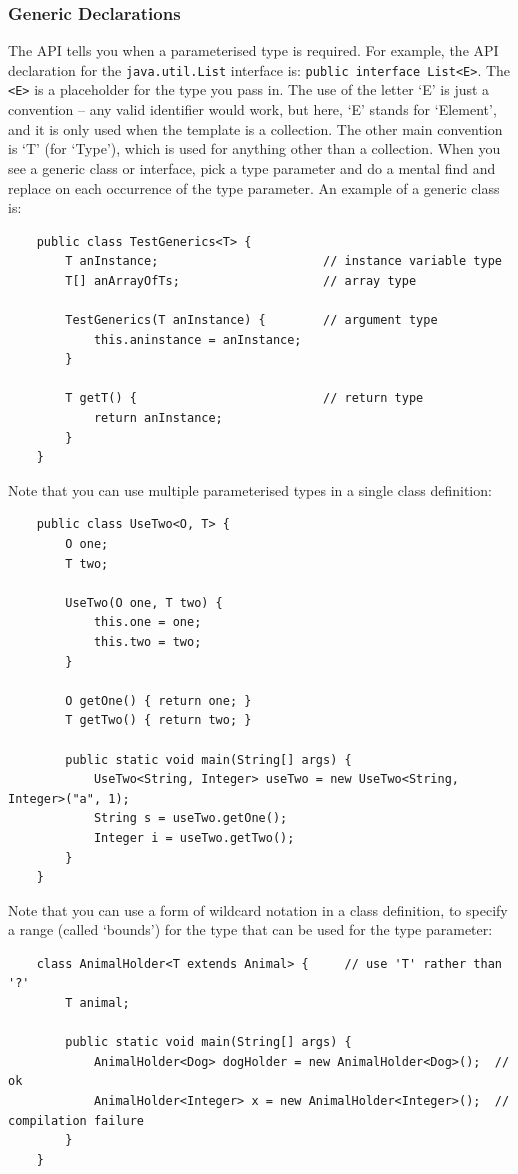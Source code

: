 \subsubsection{Generic Declarations}
The API tells you when a parameterised type is required. For example, the API 
declaration for the \verb#java.util.List# interface is: \verb#public interface List<E>#. The \verb#<E># is a placeholder for the type you pass in. The use of 
the letter `E' is just a convention -- any valid identifier would work, but 
here, `E' stands for `Element', and it is only used when the template is a 
collection. The other main convention is `T' (for `Type'), which is used for 
anything other than a collection. When you see a generic class or interface, 
pick a type parameter and do a mental find and replace on each occurrence of 
the type parameter. An example of a generic class is:
\begin{verbatim}
    public class TestGenerics<T> {
        T anInstance;                       // instance variable type
        T[] anArrayOfTs;                    // array type

        TestGenerics(T anInstance) {        // argument type
            this.aninstance = anInstance;
        }

        T getT() {                          // return type
            return anInstance;
        }
    }
\end{verbatim}
Note that you can use multiple parameterised types in a single class 
definition:
\begin{verbatim}
    public class UseTwo<O, T> {
        O one;
        T two;

        UseTwo(O one, T two) {
            this.one = one;
            this.two = two;
        }

        O getOne() { return one; }
        T getTwo() { return two; }

        public static void main(String[] args) {
            UseTwo<String, Integer> useTwo = new UseTwo<String, Integer>("a", 1);
            String s = useTwo.getOne();
            Integer i = useTwo.getTwo();
        }
    }
\end{verbatim}
Note that you can use a form of wildcard notation in a class definition, to 
specify a range (called `bounds') for the type that can be used for the type 
parameter:
\begin{verbatim}
    class AnimalHolder<T extends Animal> {     // use 'T' rather than '?'
        T animal;

        public static void main(String[] args) {
            AnimalHolder<Dog> dogHolder = new AnimalHolder<Dog>();  // ok
            AnimalHolder<Integer> x = new AnimalHolder<Integer>();  // compilation failure
        }
    }
\end{verbatim}

